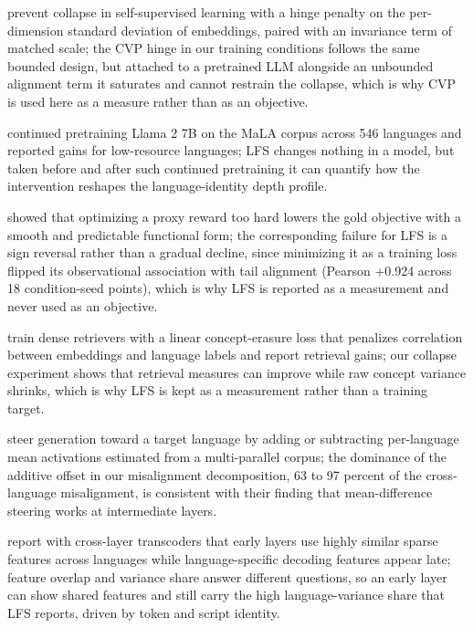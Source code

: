 \documentclass[11pt,a4paper]{article}
\begin{document}
\citet{bardes2022vicreg} prevent collapse in self-supervised learning with a hinge penalty on the per-dimension standard deviation of embeddings, paired with an invariance term of matched scale; the CVP hinge in our training conditions follows the same bounded design, but attached to a pretrained LLM alongside an unbounded alignment term it saturates and cannot restrain the collapse, which is why CVP is used here as a measure rather than as an objective.

\citet{ji2024emma} continued pretraining Llama 2 7B on the MaLA corpus across 546 languages and reported gains for low-resource languages; LFS changes nothing in a model, but taken before and after such continued pretraining it can quantify how the intervention reshapes the language-identity depth profile.

\citet{gao2023scaling} showed that optimizing a proxy reward too hard lowers the gold objective with a smooth and predictable functional form; the corresponding failure for LFS is a sign reversal rather than a gradual decline, since minimizing it as a training loss flipped its observational association with tail alignment (Pearson +0.924 across 18 condition-seed points), which is why LFS is reported as a measurement and never used as an objective.

\citet{huang2024erasure} train dense retrievers with a linear concept-erasure loss that penalizes correlation between embeddings and language labels and report retrieval gains; our collapse experiment shows that retrieval measures can improve while raw concept variance shrinks, which is why LFS is kept as a measurement rather than a training target.

\citet{sterz2025recover} steer generation toward a target language by adding or subtracting per-language mean activations estimated from a multi-parallel corpus; the dominance of the additive offset in our misalignment decomposition, 63 to 97 percent of the cross-language misalignment, is consistent with their finding that mean-difference steering works at intermediate layers.

\citet{harrasse2025transcoders} report with cross-layer transcoders that early layers use highly similar sparse features across languages while language-specific decoding features appear late; feature overlap and variance share answer different questions, so an early layer can show shared features and still carry the high language-variance share that LFS reports, driven by token and script identity.
\end{document}
